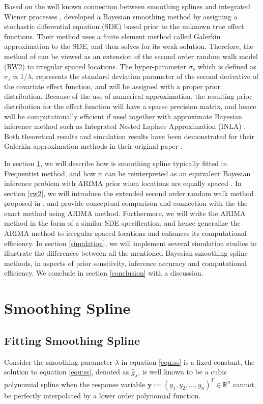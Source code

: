 \documentclass{article}
\begin{document}
Based on the well known connection between smoothing splines and integrated Wiener processes \citep{wahba}, \cite{rw2} developed a Bayesian smoothing method by assigning a stochastic differential equation (SDE) based prior to the unknown true effect functions. 
Their method uses a finite element method called Galerkin approximation to the SDE, and then solves for its weak solution. Therefore, the method of \cite{inla} can be viewed as an extension of the second order random walk model (RW2) to irregular spaced locations.
The hyper-parameter $\sigma_s$ which is defined as $\sigma_s \propto 1/\lambda$, represents the standard deviation parameter of the second derivative of the covariate effect function, and will be assigned with a proper prior distribution. Because of the use of numerical approximation, the resulting prior distribution for the effect function will have a sparse precision matrix, and hence will be computationally efficient if used together with approximate Bayesian inference method such as Integrated Nested Laplace Approximation (INLA) \citep{inla}. Both theoretical results and simulation results have been demonstrated for their Galerkin approximation methods in their original paper \citep{rw2}.


In section \ref{SmoothSpline}, we will describe how is smoothing spline typically fitted in Frequentist method, and how it can be reinterpreted as an equivalent Bayesian inference problem with ARIMA prior when locations are equally spaced \citep{ARIMA}. In section \ref{rw2}, we will introduce the extended second order random walk method proposed in \cite{rw2}, and provide conceptual comparison and connection with the the exact method using ARIMA method. Furthermore, we will write the ARIMA method in the form of a similar SDE specification, and hence generalize the ARIMA method to irregular spaced locations and enhances its computational efficiency. In section \ref{simulation}, we will implement several simulation studies to illustrate the differences between all the mentioned Bayesian smoothing spline methods, in aspects of prior sensitivity, inference accuracy and computational efficiency. We conclude in section \ref{conclusion} with a discussion.


\section{Smoothing Spline}\label{SmoothSpline}

\subsection{Fitting Smoothing Spline}
Consider the smoothing parameter $\lambda$ in equation \ref{equ:ss} is a fixed constant, the solution to equation \ref{equ:ss}, denoted as $\hat{g}_\lambda$, is well known to be a cubic polynomial spline when the response variable $\boldsymbol{y}:= (y_1, y_2, ..., y_n)^T \in \mathbb{R}^n$ cannot be perfectly interpolated by a lower order polynomial function. 
\end{document}
